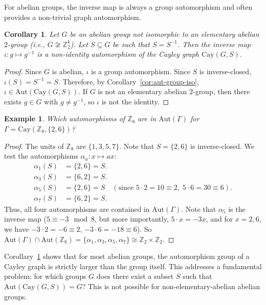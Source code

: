 \documentclass[12pt,a4paper,openany]{book}
\newtheorem{example}{Example}[section]
\newtheorem{corollary}{Corollary}[section]
\begin{document}
For abelian groups, the inverse map is always a group automorphism and often provides a non-trivial graph automorphism.

\begin{corollary}\label{cor:abelian-inverse-aut}
Let $G$ be an abelian group not isomorphic to an elementary abelian $2$-group (i.e., $G \not\cong \mathbb{Z}_2^k$). Let $S \subseteq G$ be such that $S = S^{-1}$. Then the inverse map $\iota: g \mapsto g^{-1}$ is a non-identity automorphism of the Cayley graph $\mathrm{Cay}(G, S)$.
\end{corollary}
\begin{proof}
Since $G$ is abelian, $\iota$ is a group automorphism. Since $S$ is inverse-closed, $\iota(S) = S^{-1} = S$. Therefore, by Corollary~\ref{cor:aut-group-iso}, $\iota \in \mathrm{Aut}(\mathrm{Cay}(G, S))$. If $G$ is not an elementary abelian $2$-group, then there exists $g \in G$ with $g \ne g^{-1}$, so $\iota$ is not the identity.
\end{proof}

\begin{example}
Which automorphisms of $\mathbb{Z}_8$ are in $\mathrm{Aut}(\Gamma)$ for $\Gamma = \mathrm{Cay}(\mathbb{Z}_8, \{2, 6\})$?
\end{example}
\begin{proof}
The units of $\mathbb{Z}_8$ are $\{1, 3, 5, 7\}$. Note that $S = \{2,6\}$ is inverse-closed. We test the automorphisms $\alpha_a: x \mapsto ax$:
\begin{align*}
\alpha_1(S) &= \{2,6\} = S. \\
\alpha_3(S) &= \{6,2\} = S. \\
\alpha_5(S) &= \{2,6\} = S \quad (\text{since } 5 \cdot 2 = 10 \equiv 2, \; 5 \cdot 6 = 30 \equiv 6). \\
\alpha_7(S) &= \{6,2\} = S.
\end{align*}
Thus, all four automorphisms are contained in $\mathrm{Aut}(\Gamma)$. Note that $\alpha_5$ is the inverse map ($5 \equiv -3 \mod 8$, but more importantly, $5 \cdot x = -3x$, and for $x=2,6$, we have $-3\cdot2=-6\equiv2$, $-3\cdot6=-18\equiv6$). So $\mathrm{Aut}(\Gamma) \cap \mathrm{Aut}(\mathbb{Z}_8) = \{\alpha_1, \alpha_3, \alpha_5, \alpha_7\} \cong \mathbb{Z}_2 \times \mathbb{Z}_2$.
\end{proof}

Corollary~\ref{cor:abelian-inverse-aut} shows that for most abelian groups, the automorphism group of a Cayley graph is strictly larger than the group itself. This addresses a fundamental problem: for which groups $G$ does there exist a subset $S$ such that $\mathrm{Aut}(\mathrm{Cay}(G, S)) = G$? This is not possible for non-elementary-abelian abelian groups.
\end{document}

